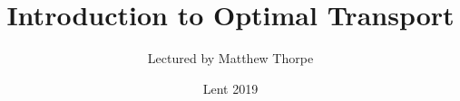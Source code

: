 \documentclass[12pt,a4paper]{article}
\newcommand{\latinmodern}[1]{{\fontfamily{lmss}\selectfont
\textbf{#1}
}}
\DeclarePairedDelimiter\bignorm{\lVert}{\rVert}
\newcommand{\doublerule}[1][.4pt]{%
  \noindent
  \makebox[0pt][l]{\rule[.7ex]{\linewidth}{#1}}%
  \rule[.3ex]{\linewidth}{#1}}
\begin{document}
\title{Introduction to Optimal Transport}
\author{Lectured by Matthew Thorpe}
\date{Lent 2019}

\maketitle

\newcommand{\statement}[1]{\latinmodern{\textbf{#1)}}}

\newcommand{\thm}{\statement{Theorem}}
\newcommand{\thmnum}[1]{\statement{Theorem #1}}
\newcommand{\defi}{\statement{Definition}}
\newcommand{\definum}[1]{\statement{Definition #1}}
\newcommand{\lem}{\statement{Lemma}}
\newcommand{\lemnum}[1]{\statement{Lemma #1}}
\newcommand{\prop}{\statement{Proposition}}
\newcommand{\propnum}[1]{\statement{Proposition #1}}
\newcommand{\corr}{\statement{Corollary}}
\newcommand{\corrnum}[1]{\statement{Corollary #1}}
\newcommand{\pf}{\textbf{proof) }}

\newcommand{\norms}[2]{\bignorm[\big]{#1}_{#2}}
\newcommand{\snorms}[2]{\bignorm[\small]{#1}_{#2}}
\newcommand{\charac}{\mathrel{\raisebox{0pt}{\scalebox{1}[1.2]{$1$}} \mkern-5.5mu \raisebox{0.04pt}{\scalebox{1}[1.2]{$\_$}} \mkern-5.5mu\raisebox{2.5pt}{\scalebox{1}[0.8]{$\bm{|}$}} }}
\newcommand{\wa}[1]{ d_{ \mathrel{\scalebox{0.5}[0.5]{$W$}}^{#1}}}

\newcommand{\lap}{\triangle} %
\newcommand{\s}{\vspace{10pt}}
\newcommand{\bull}{$\bullet$}
\newcommand{\sta}{$\star$}
\newcommand{\reals}{\mathbb{R}}

\newcommand{\eop}{\hfill  \textsl{(End of proof)} $\square$} %
\newcommand{\eos}{\hfill  \textsl{(End of statement)} $\square$} %

\newcommand{\call}[1]{\quad \cdots\cdots\cdots\,\,(#1)}

\newcommand{\intN}{\mathbb{Z}_N}
\newcommand{\nat}{\mathbb{N}}
\newcommand{\abs}[1]{\big| #1 \big|}
\newcommand{\avg}{\mathbb{E}}
\newcommand{\prob}{\mathbb{P}}
\newcommand{\borel}{\mathscr{B}}
\newcommand{\EE}{\mathscr{E}}
\newcommand{\pa}{\partial}
\newcommand{\PP}{\mathscr{P}}

\renewcommand{\vec}{\underline}
\renewcommand{\bar}{\overline}

\def\doubleunderline#1{\underline{\underline{#1}}}

\newcommand{\newday}{\doublerule[0.5pt]}
\newcommand{\digression}{**********************************************************************************************}
\end{document}

